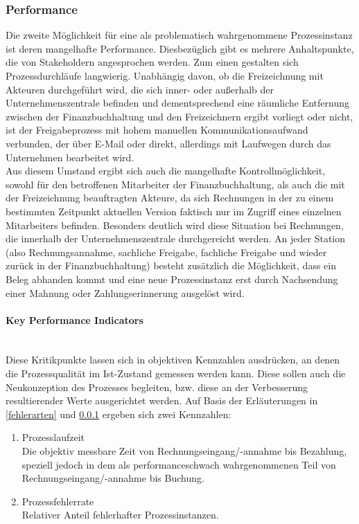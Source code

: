 \subsubsection{Performance}\label{performance}
Die zweite Möglichkeit für eine als problematisch wahrgenommene Prozessinstanz ist deren mangelhafte Performance.
Diesbezüglich gibt es mehrere Anhaltspunkte, die von Stakeholdern angesprochen werden.
Zum einen gestalten sich Prozessdurchläufe langwierig.
Unabhängig davon, ob die Freizeichnung mit Akteuren durchgeführt wird, die sich inner- oder außerhalb der Unternehmenszentrale befinden und dementsprechend eine räumliche Entfernung zwischen der Finanzbuchhaltung und den Freizeichnern ergibt vorliegt oder nicht, ist der Freigabeprozess mit hohem manuellen Kommunikationsaufwand verbunden, der über E-Mail oder direkt, allerdings mit Laufwegen durch das Unternehmen bearbeitet wird.
\\
Aus diesem Umstand ergibt sich auch die mangelhafte Kontrollmöglichkeit, sowohl für den betroffenen Mitarbeiter der Finanzbuchhaltung, als auch die mit der Freizeichnung beauftragten Akteure, da sich Rechnungen in der zu einem bestimmten Zeitpunkt aktuellen Version faktisch nur im Zugriff eines einzelnen Mitarbeiters befinden. 
Besonders deutlich wird diese Situation bei Rechnungen, die innerhalb der Unternehmenszentrale durchgereicht werden.
An jeder Station (also Rechnungsannahme, sachliche Freigabe, fachliche Freigabe und wieder zurück in der Finanzbuchhaltung) besteht zusätzlich die Möglichkeit, dass ein Beleg abhanden kommt und eine neue Prozessinstanz erst durch Nachsendung einer Mahnung oder Zahlungserinnerung ausgelöst wird.

\paragraph{Key Performance Indicators}
~\ \\
Diese Kritikpunkte lassen sich in objektiven Kennzahlen ausdrücken, an denen die Prozessqualität im Ist-Zustand gemessen werden kann. 
Diese sollen auch die Neukonzeption des Prozesses begleiten, bzw. diese an der Verbesserung resultierender Werte ausgerichtet werden.
Auf Basis der Erläuterungen in \ref{fehlerarten} und \ref{performance} ergeben sich zwei Kennzahlen:

\begin{enumerate}
\item{Prozesslaufzeit}
\\ Die objektiv messbare Zeit von Rechnungseingang/-annahme bis Bezahlung, speziell jedoch in dem als performanceschwach wahrgenommenen Teil von Rechnungseingang/-annahme bis Buchung.
\item{Prozessfehlerrate}
\\ Relativer Anteil fehlerhafter Prozessinstanzen.
\end{enumerate}




